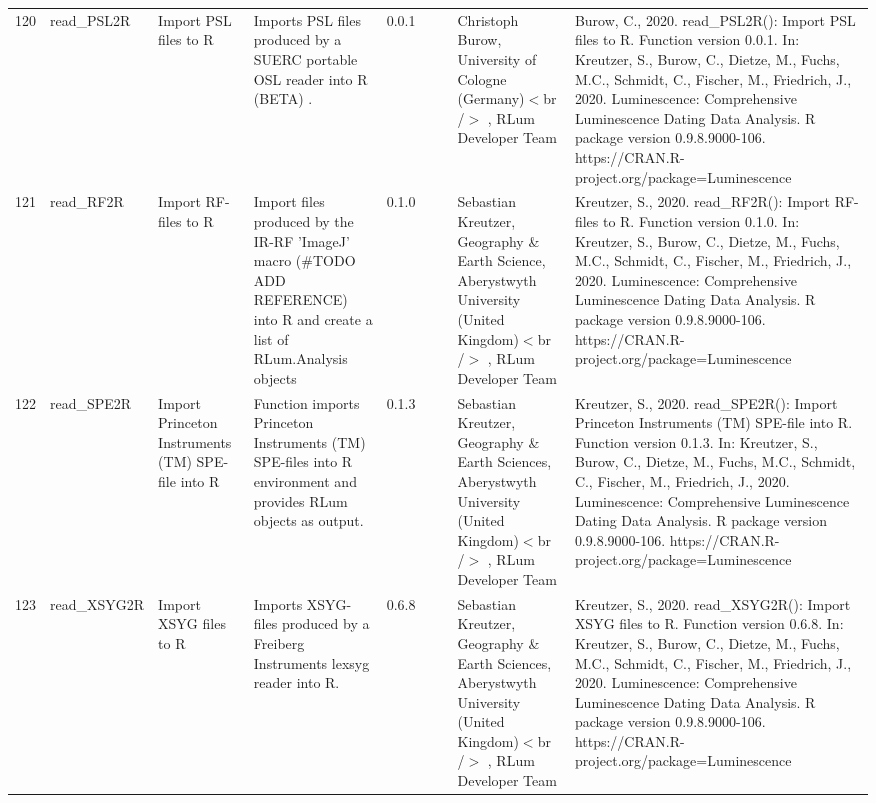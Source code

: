 \begin{table}[ht]
\begin{tabular}{rllllllll}
 \\ 
  120 & read\_PSL2R & Import PSL files to R & Imports PSL files produced by a SUERC portable OSL reader into R  (BETA) . & 0.0.1
 &  &  & Christoph Burow, University of Cologne (Germany)$<$br /$>$ , RLum Developer Team & Burow, C., 2020. read\_PSL2R(): Import PSL files to R. Function version 0.0.1. In: Kreutzer, S., Burow, C., Dietze, M., Fuchs, M.C., Schmidt, C., Fischer, M., Friedrich, J., 2020. Luminescence: Comprehensive Luminescence Dating Data Analysis. R package version 0.9.8.9000-106. https://CRAN.R-project.org/package=Luminescence
 \\ 
  121 & read\_RF2R & Import RF-files to R & Import files produced by the IR-RF 'ImageJ' macro (\#TODO ADD REFERENCE) into R and create a list of  RLum.Analysis  objects & 0.1.0
 &  &  & Sebastian Kreutzer, Geography \& Earth Science, Aberystwyth University (United Kingdom)$<$br /$>$ , RLum Developer Team & Kreutzer, S., 2020. read\_RF2R(): Import RF-files to R. Function version 0.1.0. In: Kreutzer, S., Burow, C., Dietze, M., Fuchs, M.C., Schmidt, C., Fischer, M., Friedrich, J., 2020. Luminescence: Comprehensive Luminescence Dating Data Analysis. R package version 0.9.8.9000-106. https://CRAN.R-project.org/package=Luminescence
 \\ 
  122 & read\_SPE2R & Import Princeton Instruments (TM) SPE-file into R & Function imports Princeton Instruments (TM) SPE-files into R environment and provides  RLum  objects as output. & 0.1.3
 &  &  & Sebastian Kreutzer, Geography \& Earth Sciences, Aberystwyth University (United Kingdom)$<$br /$>$ , RLum Developer Team & Kreutzer, S., 2020. read\_SPE2R(): Import Princeton Instruments (TM) SPE-file into R. Function version 0.1.3. In: Kreutzer, S., Burow, C., Dietze, M., Fuchs, M.C., Schmidt, C., Fischer, M., Friedrich, J., 2020. Luminescence: Comprehensive Luminescence Dating Data Analysis. R package version 0.9.8.9000-106. https://CRAN.R-project.org/package=Luminescence
 \\ 
  123 & read\_XSYG2R & Import XSYG files to R & Imports XSYG-files produced by a Freiberg Instruments lexsyg reader into R. & 0.6.8
 &  &  & Sebastian Kreutzer, Geography \& Earth Sciences, Aberystwyth University (United Kingdom)$<$br /$>$ , RLum Developer Team & Kreutzer, S., 2020. read\_XSYG2R(): Import XSYG files to R. Function version 0.6.8. In: Kreutzer, S., Burow, C., Dietze, M., Fuchs, M.C., Schmidt, C., Fischer, M., Friedrich, J., 2020. Luminescence: Comprehensive Luminescence Dating Data Analysis. R package version 0.9.8.9000-106. https://CRAN.R-project.org/package=Luminescence

\end{tabular}
\end{table}
